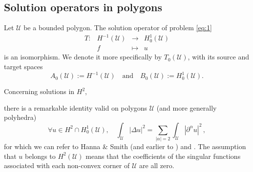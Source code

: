 \documentclass[titlepage,12pt]{amsart}
\theoremstyle{definition}
\theoremstyle{remark}
\numberwithin{equation}{section}
\newcommand{\sU}{{\mathscr U}}
\begin{document}
{
\subsection{Solution operators in polygons}
\label{ss:SolOp}
Let $\sU$ be a bounded polygon. The solution operator of problem \eqref{eq:1}
\[
\begin{array}{cccc}
   T : & H^{-1}(\sU) & \longrightarrow & H^1_0(\sU) \\
       & f &\longmapsto & u
\end{array}
\]
is an isomorphism. We denote it more specifically by $T_0(\sU)$, with its source and target spaces 
\[
   A_0(\sU) := H^{-1}(\sU)\quad\mbox{and}\quad B_0(\sU) := H^1_0(\sU).
\]

Concerning solutions in $H^2$,}
there is a remarkable identity valid on polygons $\sU$ (and more generally polyhedra)
\begin{equation}
\label{eq:H2}
   \forall u \in H^2\cap H^1_0(\sU),\quad
   \int_\sU |\Delta u |^2 = \sum_{|\alpha|=2} \int_\sU |\partial^\alpha u |^2\,,
\end{equation}
for which we can refer to Hanna \& Smith \cite{HannaSmith:1967} (and earlier to \cite{Aronszajn:1951}) and \cite{Grisvard:1972}. The assumption that $u$ belongs to $H^2(\sU)$ means that the coefficients of the singular functions associated with each non-convex corner of $\sU$ are all zero. 
\end{document}

